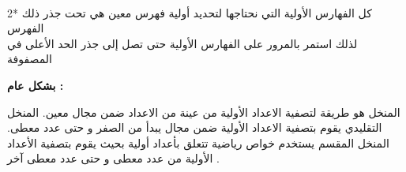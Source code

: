 \documentclass[11pt,a4paper]{report}
\begin{document}
\begin{otherlanguage}{arabic}
\begin{otherlanguage}{arabic}
\begin{center}
\\
2* كل الفهارس الأولية التي نحتاجها لتحديد أولية فهرس معين هي تحت جذر ذلك الفهرس 
\\
لذلك استمر بالمرور على الفهارس الأولية حتى تصل إلى جذر الحد الأعلى في المصفوفة  \textit{ }
\\
\begin{flushleft}
\textbf{بشكل عام :}
\end{flushleft}
المنخل هو طريقة لتصفية الاعداد الأولية من عينة من الاعداد ضمن مجال معين. 
\newline
المنخل التقليدي يقوم بتصفية الاعداد الأولية ضمن مجال يبدأ من الصفر و حتى عدد معطى.
\newline
المنخل المقسم يستخدم خواص رياضية تتعلق بأعداد أولية بحيث يقوم بتصفية الأعداد الأولية من عدد معطى و حتى عدد معطى آخر .
\end{center}
\end{otherlanguage}

\end{otherlanguage}
\end{document}
